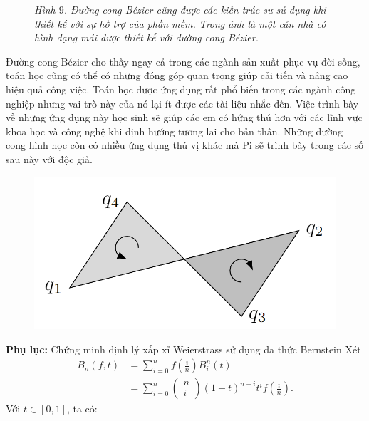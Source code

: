 \begin{multicols}{2}
\begin{figure}[H]
			\caption{\small\textit{\color{toanhocdoisong}Hình $9$. Đường cong Bézier cũng được các kiến trúc sư sử dụng khi thiết kế với sự hỗ trợ của phần mềm. Trong ảnh là một căn nhà có hình dạng mái được thiết kế với đường cong Bézier.}}
			\vspace*{-10pt}
		\end{figure}
		Đường cong Bézier cho thấy ngay cả trong các ngành sản xuất phục vụ đời sống, toán học cũng có thể có những đóng góp quan trọng giúp cải tiến và nâng cao hiệu quả công việc. Toán học được ứng dụng rất phổ biến trong các ngành công nghiệp nhưng vai trò này của nó lại ít được các tài liệu nhắc đến. Việc trình bày về những ứng dụng này học sinh sẽ giúp các em có hứng thú hơn với các lĩnh vực khoa học và công nghệ khi định hướng tương lai cho bản thân. Những đường cong hình học còn có nhiều ứng dụng thú vị khác mà Pi sẽ trình bày trong các số sau này với độc giả.
		\begin{figure}[H]
			\vspace*{-5pt}
			\centering
			\captionsetup{labelformat= empty, justification=centering}
			\includegraphics[width= 1\linewidth]{16}
			\vspace*{-18pt}
		\end{figure}
		\textbf{\color{toanhocdoisong}Phụ lục:} Chứng minh định lý xấp xỉ Weierstrass sử dụng đa thức Bernstein
		\vskip 0.1cm
		Xét 
		\begin{align*}
			B_n(f,t) &= \sum\limits_{i = 0}^n {f\left( {\frac{i}{n}} \right)B_i^n(t)}  \\
			&= \sum\limits_{i = 0}^n {\left( \begin{array}{l}
					n\\
					i
				\end{array} \right){{(1 - t)}^{n - i}}{t^i}f\left( {\frac{i}{n}} \right)}.
		\end{align*}
		Với $t\in [0,1]$, ta có:

\end{multicols}
